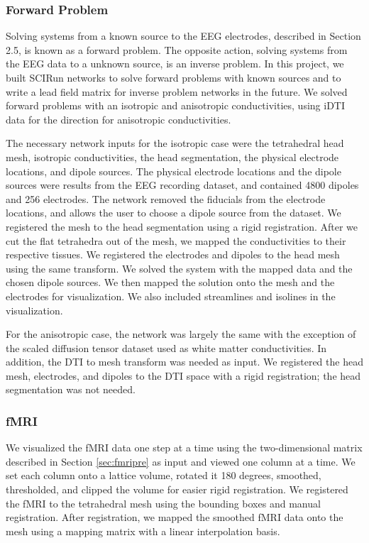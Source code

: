 \subsubsection{Forward Problem}

Solving systems from a known source to the EEG electrodes, described in Section 2.5, is known as a forward problem. The opposite action, solving systems from the EEG data to a unknown source, is an inverse problem.  In this project, we built SCIRun networks to solve forward problems with known sources and to write a lead field matrix for inverse problem networks in the future. We solved forward problems with an isotropic and anisotropic conductivities, using iDTI data for the direction for anisotropic conductivities.

The necessary network inputs for the isotropic case were the tetrahedral head mesh, isotropic conductivities, the head segmentation, the physical electrode locations, and dipole sources. The physical electrode locations and the dipole sources were results from the EEG recording dataset, and contained 4800 dipoles and 256 electrodes. The network removed the fiducials from the electrode locations, and allows the user to choose a dipole source from the dataset. We registered the mesh to the head segmentation using a rigid registration. After we cut the flat tetrahedra out of the mesh, we mapped the conductivities to their respective tissues. We registered the electrodes and dipoles to the head mesh using the same transform. We solved the system with the mapped data and the chosen dipole sources. We then mapped the solution onto the mesh and the electrodes for visualization. We also included streamlines and isolines in the visualization.

For the anisotropic case, the network was largely the same with the exception of the scaled diffusion tensor dataset used as white matter conductivities. In addition, the DTI to mesh transform was needed as input. We registered the head mesh, electrodes, and dipoles to the DTI space with a rigid registration; the head segmentation was not needed.

\subsubsection{fMRI}

We visualized the fMRI data one step at a time using the two-dimensional matrix described in Section \ref{sec:fmripre} as input and viewed one column at a time. We set each column onto a lattice volume, rotated it 180 degrees, smoothed, thresholded, and clipped the volume for easier rigid registration. We registered the fMRI to the tetrahedral mesh using the bounding boxes and manual registration. After registration, we mapped the smoothed fMRI data onto the mesh using a mapping matrix with a linear interpolation basis.

